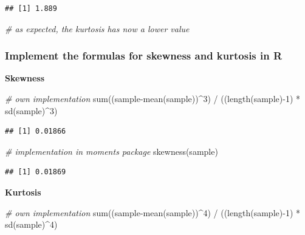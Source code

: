 \documentclass[
  12pt,
]{style/krantz}
\newenvironment{Shaded}{\begin{snugshade}}{\end{snugshade}}
\newcommand{\CommentTok}[1]{\textcolor[rgb]{0.56,0.35,0.01}{\textit{#1}}}
\newcommand{\DecValTok}[1]{\textcolor[rgb]{0.00,0.00,0.81}{#1}}
\newcommand{\FunctionTok}[1]{\textcolor[rgb]{0.00,0.00,0.00}{#1}}
\newcommand{\NormalTok}[1]{#1}
\newcommand{\SpecialCharTok}[1]{\textcolor[rgb]{0.00,0.00,0.00}{#1}}
\begin{document}
\begin{verbatim}
## [1] 1.889
\end{verbatim}

\begin{Shaded}
\begin{Highlighting}[]
\CommentTok{\# as expected, the kurtosis has now a lower value}
\end{Highlighting}
\end{Shaded}

\hypertarget{implement-the-formulas-for-skewness-and-kurtosis-in-r}{%
\subsubsection{Implement the formulas for skewness and kurtosis in R}\label{implement-the-formulas-for-skewness-and-kurtosis-in-r}}

\textbf{Skewness}

\begin{Shaded}
\begin{Highlighting}[]
\CommentTok{\# own implementation}
\FunctionTok{sum}\NormalTok{((sample}\SpecialCharTok{{-}}\FunctionTok{mean}\NormalTok{(sample))}\SpecialCharTok{\^{}}\DecValTok{3}\NormalTok{) }\SpecialCharTok{/}\NormalTok{ ((}\FunctionTok{length}\NormalTok{(sample)}\SpecialCharTok{{-}}\DecValTok{1}\NormalTok{) }\SpecialCharTok{*} \FunctionTok{sd}\NormalTok{(sample)}\SpecialCharTok{\^{}}\DecValTok{3}\NormalTok{)}
\end{Highlighting}
\end{Shaded}

\begin{verbatim}
## [1] 0.01866
\end{verbatim}

\begin{Shaded}
\begin{Highlighting}[]
\CommentTok{\# implementation in moments package}
\FunctionTok{skewness}\NormalTok{(sample)}
\end{Highlighting}
\end{Shaded}

\begin{verbatim}
## [1] 0.01869
\end{verbatim}

\textbf{Kurtosis}

\begin{Shaded}
\begin{Highlighting}[]
\CommentTok{\# own implementation}
\FunctionTok{sum}\NormalTok{((sample}\SpecialCharTok{{-}}\FunctionTok{mean}\NormalTok{(sample))}\SpecialCharTok{\^{}}\DecValTok{4}\NormalTok{) }\SpecialCharTok{/}\NormalTok{ ((}\FunctionTok{length}\NormalTok{(sample)}\SpecialCharTok{{-}}\DecValTok{1}\NormalTok{) }\SpecialCharTok{*} \FunctionTok{sd}\NormalTok{(sample)}\SpecialCharTok{\^{}}\DecValTok{4}\NormalTok{)}
\end{Highlighting}
\end{Shaded}
\end{document}
